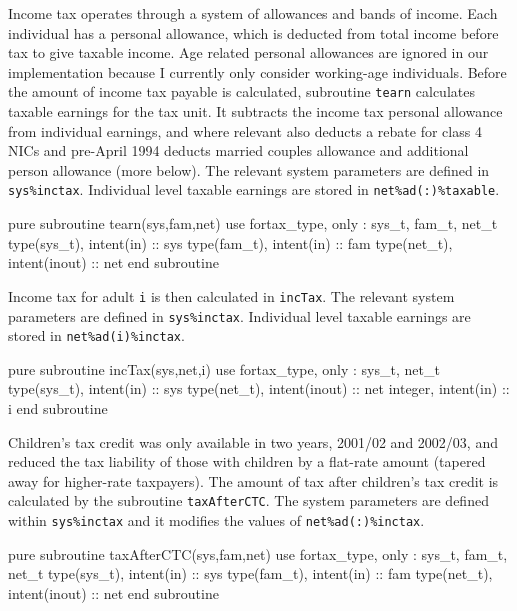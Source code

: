 \documentclass[11pt,thmsa,letter,ukenglish]{article}
\begin{document}
Income tax operates through a system of allowances and bands of income. Each individual has a personal allowance, which is deducted from total income before tax to give taxable income. Age related personal allowances are ignored in our implementation because I currently only consider working-age individuals. Before the amount of income tax payable is calculated, subroutine \texttt{tearn} calculates taxable earnings for the tax unit. It subtracts the income tax personal allowance from individual earnings, and where relevant also deducts a rebate for class 4 NICs and pre-April 1994 deducts married couples allowance and additional person allowance (more below). The relevant system parameters are defined in \texttt{sys\%inctax}. Individual level taxable earnings are stored in \texttt{net\%ad(:)\%taxable}.

\begin{fortrancode}
pure subroutine tearn(sys,fam,net)
    use fortax_type, only : sys_t, fam_t, net_t
    type(sys_t), intent(in)    :: sys
    type(fam_t), intent(in)    :: fam
    type(net_t), intent(inout) :: net
end subroutine
\end{fortrancode}

\noindent Income tax for adult \texttt{i} is then calculated in \texttt{incTax}. The relevant system parameters are defined in \texttt{sys\%inctax}. Individual level taxable earnings are stored in \texttt{net\%ad(i)\%inctax}.

\begin{fortrancode}
pure subroutine incTax(sys,net,i)
    use fortax_type, only : sys_t, net_t
    type(sys_t), intent(in)    :: sys
    type(net_t), intent(inout) :: net
    integer,     intent(in)    :: i
end subroutine
\end{fortrancode}

\noindent Children's tax credit was only available in two years, 2001/02 and 2002/03, and reduced the tax liability of those with children by a flat-rate amount (tapered away for higher-rate taxpayers). The amount of tax after children's tax credit is calculated by the subroutine \texttt{taxAfterCTC}. The system parameters are defined within \texttt{sys\%inctax} and it modifies the values of \texttt{net\%ad(:)\%inctax}.

\begin{fortrancode}
pure subroutine taxAfterCTC(sys,fam,net)
    use fortax_type, only : sys_t, fam_t, net_t
    type(sys_t), intent(in)    :: sys
    type(fam_t), intent(in)    :: fam
    type(net_t), intent(inout) :: net
end subroutine
\end{fortrancode}
\end{document}
